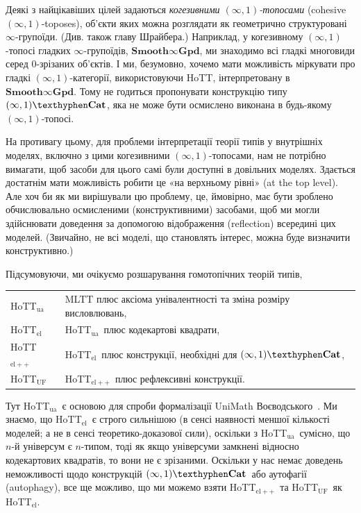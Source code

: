 \documentclass[12pt]{article}
\newcommand*{\inftyone}{\ensuremath{(\infty,1)}}
\newcommand*{\SmoothInftyGpd}{\ensuremath{\mathbf{Smooth}\infty\mathbf{Gpd}}}
\newcommand*{\inftyoneCat}{\ensuremath{(\infty,1)\mathbf{\texthyphen Cat}}}
\newcommand*{\HoTTua}{HoTT$_{\mathrm{ua}}$}
\newcommand*{\HoTTel}{HoTT$_{\mathrm{el}}$}
\newcommand*{\HoTTelp}{HoTT$_{\mathrm{el}{+}{+}}$}
\newcommand*{\HoTTuf}{HoTT$_{\mathrm{UF}}$}
\begin{document}
Деякі з найцікавіших цілей задаються \emph{когезивними \inftyone-топосами} (cohesive \inftyone-toposes), об'єкти яких можна розглядати як геометрично структуровані $\infty$-групоїди. (Див. також главу Шрайбера.) Наприклад, у когезивному \inftyone-топосі гладких $\infty$-групоїдів, \SmoothInftyGpd, ми знаходимо всі гладкі многовиди серед $0$-зрізаних об'єктів. І ми, безумовно, хочемо мати можливість міркувати про гладкі \inftyone-категорії, використовуючи HoTT, інтерпретовану в \SmoothInftyGpd. Тому не годиться пропонувати конструкцію типу \inftyoneCat, яка не може бути осмислено виконана в будь-якому \inftyone-топосі.

На противагу цьому, для проблеми інтерпретації теорії типів у внутрішніх моделях, включно з цими когезивними \inftyone-топосами, нам не потрібно вимагати, щоб засоби для цього самі були доступні в довільних моделях. Здається достатнім мати можливість робити це «на верхньому рівні» (at the top level). Але хоч би як ми вирішували цю проблему, це, ймовірно, має бути зроблено обчислювально осмисленими (конструктивними) засобами, щоб ми могли здійснювати доведення за допомогою відображення (reflection) всередині цих моделей. (Звичайно, не всі моделі, що становлять інтерес, можна буде визначити конструктивно.)

Підсумовуючи, ми очікуємо розшарування гомотопічних теорій типів,

\smallskip

\begin{tabular}{@{\textbullet\ }l@{\ :\ }l}
  \HoTTua  & MLTT плюс аксіома унівалентності та зміна розміру висловлювань, \\
  \HoTTel  & \HoTTua\ плюс кодекартові квадрати, \\
  \HoTTelp & \HoTTel\ плюс конструкції, необхідні для \inftyoneCat, \\
  \HoTTuf  & \HoTTelp\ плюс рефлексивні конструкції.
\end{tabular}

\smallskip

\noindent Тут \HoTTua~є основою для спроби формалізації UniMath Воєводського~\cite{Voevodsky2015,UniMath}. Ми знаємо, що \HoTTel~є строго сильнішою (в сенсі наявності меншої кількості моделей; а не в сенсі теоретико-доказової сили), оскільки з \HoTTua~сумісно, що $n$-й універсум є $n$-типом, тоді як якщо універсуми замкнені відносно кодекартових квадратів, то вони не є зрізаними. Оскільки у нас немає доведень неможливості щодо конструкцій \inftyoneCat~або аутофагії (autophagy), все ще можливо, що ми можемо взяти \HoTTelp~та \HoTTuf~як \HoTTel.
\end{document}
